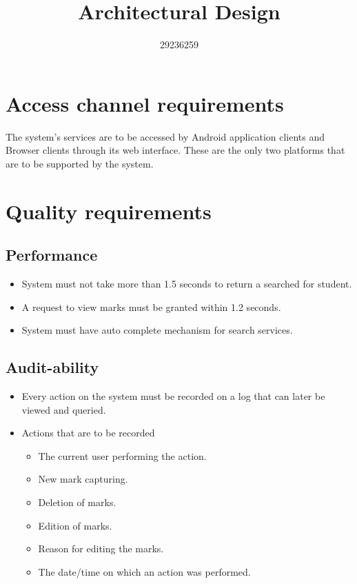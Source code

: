 \documentclass[11pt,a4paper]{article}
\begin{document}
\begin{titlepage}
\title{Architectural Design}
\author{29236259}
\maketitle
\end{titlepage}


\section{Access channel requirements}
The system's services are to be accessed by Android application clients and Browser clients through its web interface. These are the only two platforms that are to be supported by the system. 
\section{Quality requirements}
\subsection{Performance}
\begin{itemize}
\item System must not take more than 1.5 seconds to return a searched for student.
\item A request to view marks must be granted within 1.2 seconds.
\item System must have auto complete mechanism for search services.
\end{itemize}
\subsection{Audit-ability}
\begin{itemize}
\item Every action on the system must be recorded on a log that can later be viewed and queried.
\item Actions that are to be recorded
\begin{itemize}
\item The current user performing the action.
\item New mark capturing.
\item Deletion of marks.
\item Edition of marks.
\item Reason for editing the marks.
\item The date/time on which an action was performed.
\end{itemize}
\end{itemize}
\end{document}
